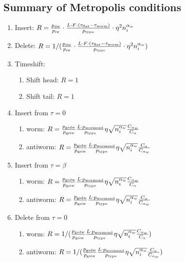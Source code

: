 \documentclass[12pt, two sided]{article}
\begin{document}
\subsection{Summary of Metropolis conditions}
	\begin{enumerate}
	\setcounter{enumi}{0}
		\item Insert: $R = \frac{p_{\rm{dw}}}{p_{\rm{iw}}} \cdot \frac{L \cdot F \cdot (\tau_{\rm{flat}}-\tau_{\rm{worm}})}{p_{\rm{type}}} \cdot \eta^2 n_i^{\alpha_w}$
		\item Delete: $R = 1/(\frac{p_{\rm{dw}}}{p_{\rm{iw}}} \cdot \frac{L \cdot F \cdot (\tau_{\rm{flat}}-\tau_{\rm{worm}})}{p_{\rm{type}}} \cdot \eta^2 n_i^{\alpha_w} )$
		\item Timeshift: 		
		\begin{enumerate}
		\item{Shift head: $R =  1$}
		\item{Shift tail: $R = 1$}
		\end{enumerate}
		\item Insert from $\tau=0$
		\begin{enumerate}
		\item{worm: $R =  \frac{p_{\rm{gsdw}}}{p_{\rm{gsiw}}} \frac{L \cdot p_{\rm{wormend}}}{p_{\rm{type}}} \eta \sqrt{n_i^{\alpha_w}} \frac{C_{\alpha_w}}{C_{\alpha}} $ }
		\item{antiworm: $R =  \frac{p_{\rm{gsdw}}}{p_{\rm{gsiw}}} \frac{L \cdot p_{\rm{wormend}}}{p_{\rm{type}}} \eta \sqrt{n_i^{\alpha_w}} \frac{C_{\alpha}}{C_{\alpha_w}}$}
		\end{enumerate}
		\item Insert from $\tau=\beta$
		\begin{enumerate}
		\item{worm: $R =  \frac{p_{\rm{gsdw}}}{p_{\rm{gsiw}}} \frac{L \cdot p_{\rm{wormend}}}{p_{\rm{type}}}\eta \sqrt{n_i^{\alpha_w}} \frac{C_{\alpha_w}}{C_{\alpha}} $}
		\item{antiworm: $R =  \frac{p_{\rm{gsdw}}}{p_{\rm{gsiw}}} \frac{L \cdot p_{\rm{wormend}}}{p_{\rm{type}}} \eta \sqrt{n_i^{\alpha_w}} \frac{C_{\alpha}}{C_{\alpha_w}}$}
		\end{enumerate}
		\item Delete from $\tau=0$
		\begin{enumerate}
		\item{worm: $R =  1/(\frac{p_{\rm{gsdw}}}{p_{\rm{gsiw}}} \frac{L \cdot p_{\rm{wormend}}}{p_{\rm{type}}} \eta \sqrt{n_i^{\alpha_w}} \frac{C_{\alpha_w}}{C_{\alpha}} ) $ }
		\item{antiworm: $R = 1/(\frac{p_{\rm{gsdw}}}{p_{\rm{gsiw}}} \frac{L \cdot p_{\rm{wormend}}}{p_{\rm{type}}} \eta \sqrt{n_i^{\alpha_w}} \frac{C_{\alpha}}{C_{\alpha_w}})$}

\end{enumerate}
\end{enumerate}
\end{document}
